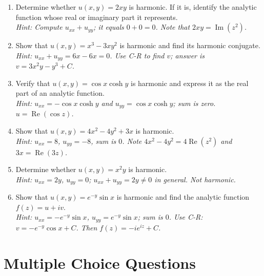 \documentclass[12pt,a4paper]{article}
\begin{document}
\begin{enumerate}
  \item Determine whether $u(x,y)=2xy$ is harmonic. If it is, identify the analytic function
  whose real or imaginary part it represents. \\
  \textit{Hint: Compute $u_{xx}+u_{yy}$; it equals $0+0=0$. Note that $2xy=\operatorname{Im}(z^{2})$.}

  \item Show that $u(x,y)=x^{3}-3xy^{2}$ is harmonic and find its harmonic conjugate. \\
  \textit{Hint: $u_{xx}+u_{yy}=6x-6x=0$. Use C-R to find $v$; answer is $v=3x^{2}y-y^{3}+C$.}

  \item Verify that $u(x,y)=\cos x \cosh y$ is harmonic and express it as the real part of an
  analytic function. \\
  \textit{Hint: $u_{xx}=-\cos x\cosh y$ and $u_{yy}=\cos x\cosh y$; sum is zero. $u=\operatorname{Re}(\cos z)$.}

  \item Show that $u(x,y)=4x^{2}-4y^{2}+3x$ is harmonic. \\
  \textit{Hint: $u_{xx}=8$, $u_{yy}=-8$, sum is $0$. Note $4x^{2}-4y^{2}=4\operatorname{Re}(z^{2})$ and $3x=\operatorname{Re}(3z)$.}

  \item Determine whether $u(x,y)=x^{2}y$ is harmonic. \\
  \textit{Hint: $u_{xx}=2y$, $u_{yy}=0$; $u_{xx}+u_{yy}=2y\neq 0$ in general. Not harmonic.}

  \item Show that $u(x,y)=e^{-y}\sin x$ is harmonic and find the analytic function $f(z)=u+iv$.\\
  \textit{Hint: $u_{xx}=-e^{-y}\sin x$, $u_{yy}=e^{-y}\sin x$; sum is $0$. Use C-R: $v=-e^{-y}\cos x+C$. Then $f(z)=-ie^{iz}+C$.}
\end{enumerate}

\section{Multiple Choice Questions}
\end{document}
